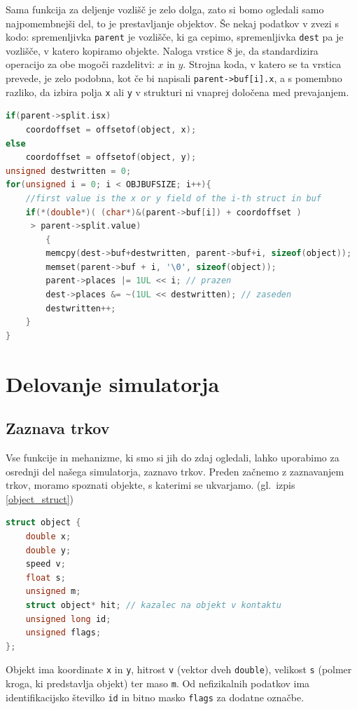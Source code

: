 \documentclass[a4paper,12pt]{article}
\begin{document}
Sama funkcija za deljenje vozlišč je zelo dolga, zato si bomo ogledali samo najpomembnejši
del, to je prestavljanje objektov. Še nekaj podatkov v zvezi s kodo: spremenljivka \lstinline|parent|
je vozlišče, ki ga cepimo, spremenljivka \lstinline|dest| pa je vozlišče, v katero kopiramo objekte.
Naloga vrstice 8 je, da standardizira operacijo za obe mogoči razdelitvi: $x$ in $y$. Strojna koda, v
katero se ta vrstica prevede, je zelo podobna, kot če bi napisali \lstinline|parent->buf[i].x|, a s pomembno razliko, da izbira
polja \lstinline|x| ali \lstinline|y| v strukturi ni vnaprej določena med prevajanjem.

\begin{lstlisting}[caption={Razdeljevanje objektov med potomcema}, label=balance_buffers, language=C]
if(parent->split.isx) 
    coordoffset = offsetof(object, x);
else 
    coordoffset = offsetof(object, y);
unsigned destwritten = 0;
for(unsigned i = 0; i < OBJBUFSIZE; i++){
    //first value is the x or y field of the i-th struct in buf
    if(*(double*)( (char*)&(parent->buf[i]) + coordoffset )
     > parent->split.value)
        {
        memcpy(dest->buf+destwritten, parent->buf+i, sizeof(object));
        memset(parent->buf + i, '\0', sizeof(object));
        parent->places |= 1UL << i; // prazen
        dest->places &= ~(1UL << destwritten); // zaseden
        destwritten++;
    }
}
\end{lstlisting}
\newpage
\section{Delovanje simulatorja}
\subsection{Zaznava trkov}
Vse funkcije in mehanizme, ki smo si jih do zdaj ogledali, lahko uporabimo za osrednji del
našega simulatorja, zaznavo trkov.
Preden začnemo z zaznavanjem trkov, moramo spoznati objekte, s katerimi se ukvarjamo. (gl.\  izpis \ref{object_struct})
\begin{lstlisting}[caption={Struktura objekta}, label=object_struct, language=C]
struct object {
    double x;
    double y;
    speed v;
    float s;
    unsigned m;
    struct object* hit; // kazalec na objekt v kontaktu
    unsigned long id;
    unsigned flags;
};
\end{lstlisting}
Objekt ima koordinate \lstinline|x| in \lstinline|y|, hitrost \lstinline|v| (vektor dveh \lstinline|double|),
velikost \lstinline|s| (polmer kroga, ki predstavlja objekt) ter maso \lstinline|m|. Od nefizikalnih podatkov ima
identifikacijsko številko \lstinline|id| in bitno masko \lstinline|flags| za dodatne označbe.
\end{document}

